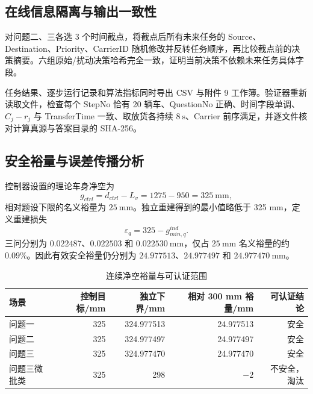 \documentclass[UTF8]{ctexart}
\begin{document}
\subsection{在线信息隔离与输出一致性}

对问题二、三各选 3 个时间截点，将截点后所有未来任务的 Source、Destination、Priority、CarrierID 随机修改并反转任务顺序，再比较截点前的决策摘要。六组原始/扰动决策哈希完全一致，证明当前决策不依赖未来任务具体字段。

任务结果、逐步运行记录和算法指标同时导出 CSV 与附件 9 工作簿。验证器重新读取文件，检查每个 StepNo 恰有 20 辆车、QuestionNo 正确、时间字段单调、$C_j-r_j$ 与 TransferTime 一致、取放货各持续 $8\ \mathrm{s}$、Carrier 前序满足，并逐文件核对计算真源与答案目录的 SHA-256。

\subsection{安全裕量与误差传播分析}

控制器设置的理论车身净空为
\begin{equation}
g_{ctrl}=d_{ctrl}-L_v=1275-950=325\ \mathrm{mm},
\end{equation}
相对题设下限的名义裕量为 $25\ \mathrm{mm}$。独立重建得到的最小值略低于 325 mm，定义重建损失
\begin{equation}
\varepsilon_q=325-g_{min,q}^{ind}.
\end{equation}
三问分别为 $0.022487$、$0.022503$ 和 $0.022530\ \mathrm{mm}$，仅占 $25\ \mathrm{mm}$ 名义裕量的约 $0.09\%$。因此有效安全裕量仍分别为 $24.977513$、$24.977497$ 和 $24.977470\ \mathrm{mm}$。

\begin{table}[H]
\centering
\caption{连续净空裕量与可认证范围}
\label{tab:clearance-sensitivity}
\renewcommand{\arraystretch}{1.28}
\begin{tabular*}{\textwidth}{@{\extracolsep{\fill}}lrrrr@{}}
\toprule[1pt]
场景 & 控制目标/mm & 独立下界/mm & 相对 300 mm 裕量/mm & 可认证结论\\ \midrule
问题一 & 325 & 324.977513 & 24.977513 & 安全\\
问题二 & 325 & 324.977497 & 24.977497 & 安全\\
问题三 & 325 & 324.977470 & 24.977470 & 安全\\
问题三微批类 & 325 & 298 & $-2$ & 不安全，淘汰\\
\bottomrule[1pt]
\end{tabular*}
\end{table}
\end{document}
